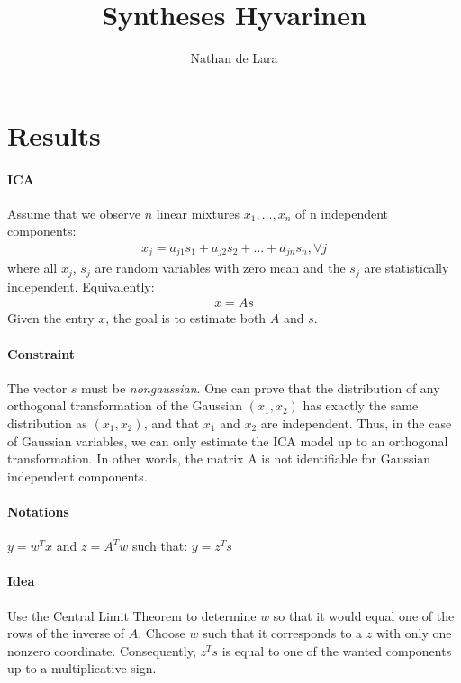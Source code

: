 \documentclass[a4paper,twoside,10pt]{article}
\begin{document}
\pagestyle{empty}

\title{Syntheses Hyvarinen}

\author{Nathan de Lara}
\maketitle

\section{Results}
\paragraph{ICA}
Assume that we observe $n$ linear mixtures $x_1, ...,x_n$ of n independent components:
\begin{align*}
x_j = a_{j1}s_1+a_{j2}s_2+...+a_{jn}s_n, \forall j
\end{align*}
where all $x_j$, $s_j$ are random variables with zero mean and the $s_j$ are statistically independent. Equivalently:
\begin{align*}
x = As
\end{align*}
Given the entry $x$, the goal is to estimate both $A$ and $s$.

\paragraph{Constraint} The vector $s$ must be \textit{nongaussian}. One can prove that the distribution of any orthogonal transformation of the Gaussian $(x_1,x_2)$
has exactly the same distribution as $(x_1,x_2)$, and that $x_1$ and $x_2$ are independent. Thus, in the case of Gaussian variables, we can only estimate the ICA model up to an orthogonal transformation. In other words, the matrix A is not identifiable for Gaussian independent components.

\paragraph{Notations} $y = w^Tx$ and $z=A^Tw$ such that: $y = z^Ts$

\paragraph{Idea} Use the Central Limit Theorem to determine $w$ so that it would
equal one of the rows of the inverse of $A$. Choose $w$ such that it corresponds to a $z$ with only one nonzero coordinate. Consequently, $z^Ts$ is equal to one of the wanted components up to a multiplicative sign.
\end{document}
